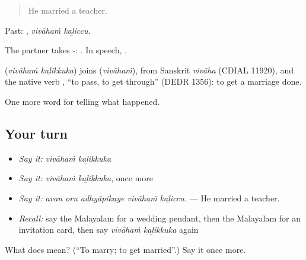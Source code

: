 \begin{quote}
He married a teacher.
\end{quote}

Past:  , \emph{vivāhaṁ kaḻiccu}.

The partner takes -:   . In speech,  .

\begin{cousinweb}
\textbf{ } (\emph{vivāhaṁ kaḻikkuka}) joins  (\emph{vivāhaṁ}), from Sanskrit \emph{vivāha} (CDIAL 11920), and the native verb , \textquotedblleft{}to pass, to get through\textquotedblright{} (DEDR 1356): to get a marriage done.
\end{cousinweb}

\begin{grammarlens}[title={What you've built}]
One more word for telling what happened.
\end{grammarlens}

\subsection*{Your turn}
\begin{itemize}
\raggedright
  \item \emph{Say it:} \emph{vivāhaṁ kaḻikkuka}
  \item \emph{Say it:} \emph{vivāhaṁ kaḻikkuka}, once more
  \item \emph{Say it:} \emph{avan oru adhyāpikaye vivāhaṁ kaḻiccu.} — He married a teacher.
  \item \emph{Recall:} say the Malayalam for a wedding pendant, then the Malayalam for an invitation card, then say \emph{vivāhaṁ kaḻikkuka} again
\end{itemize}

\begin{tcolorbox}[breakable,colback=teal!4,colframe=teal!35!black,title={Before you move on}]
What does   mean? (\textquotedblleft{}To marry; to get married\textquotedblright{}.) Say it once more.
\end{tcolorbox}
